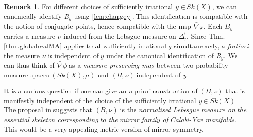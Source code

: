 \documentclass[a4paper]{article}
\theoremstyle{definition}
\newtheorem{rmk}[thm]{Remark}
\begin{document}
	
	\begin{rmk}
	For different choices of sufficiently irrational $y\in Sk(X)$, we can canonically identify $B_y$ using \ref{lem:changey}. This identification is compatible with the notion of conjugate points, hence compatible with the map $\bar{\nabla}\varphi$. 
	 Each $B_y$ carries a measure $\nu$ induced from the Lebsgue measure on $\Delta_y^0$. Since Thm. \ref{thm:globalrealMA} applies to all sufficiently irrational $y$ simultaneously, \emph{a fortiori} the measure $\nu$ is  independent of $y$ under the canonical identification of $B_y$.  We can thus think of $\bar{\nabla}\phi$ as a \emph{measure preserving map}  between two probability measure spaces $(Sk(X),\mu)$ and $(B, \nu)$ independent of $y$.
	
	It is a curious question if one can give an a priori construction of $(B,\nu)$ that is manifestly independent of the choice of the sufficiently irrational $y\in Sk(X)$. The proposal in \cite[Section 6.3]{Litheta} suggests that $(B,\nu)$ is the \emph{normalised Lebesgue measure on the essential skeleton corresponding to the mirror family of Calabi-Yau manifolds}. This would be a very appealing metric version of mirror symmetry.
	\end{rmk}
	
	
	
	
	

	
	
	

	

	
	
\end{document}
